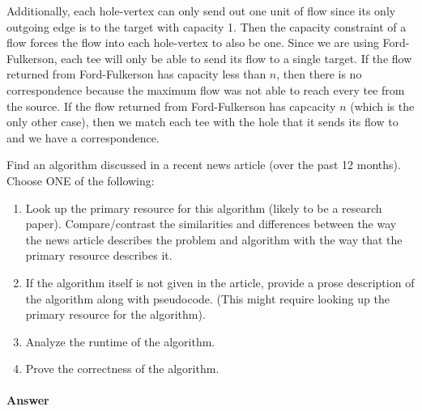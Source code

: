 \documentclass{article}
\begin{document}
\begin{enumerate}
    Additionally, each hole-vertex can only send out one unit of flow since its only outgoing edge is to the target with capacity 1.
    Then the capacity constraint of a flow forces the flow into each hole-vertex to also be one. \parspace
    Since we are using Ford-Fulkerson, each tee will only be able to send its flow to a single target.
    If the flow returned from Ford-Fulkerson has capacity less than $n$, then there is no correspondence because the maximum flow was not able to reach every tee from the source.
    If the flow returned from Ford-Fulkerson has capcacity $n$ (which is the only other case), then we match each tee with the hole that it sends its flow to and we have a correspondence.
\end{enumerate}


\nextprob
{}

Find an algorithm discussed in a recent news article (over the past 12 months).
Choose ONE of the following:
\begin{enumerate}
    \item Look up the primary resource for this algorithm (likely to be a research paper).
    Compare/contrast the similarities and differences between the way the news article describes the problem and algorithm with the way that the primary resource describes it.
    \item If the algorithm itself is not given in the article, provide a prose description of the algorithm along with pseudocode.
    (This might require looking up the primary resource for the algorithm).
    \item Analyze the runtime of the algorithm.
    \item Prove the correctness of the algorithm.
\end{enumerate}

\paragraph{Answer}
\end{document}
